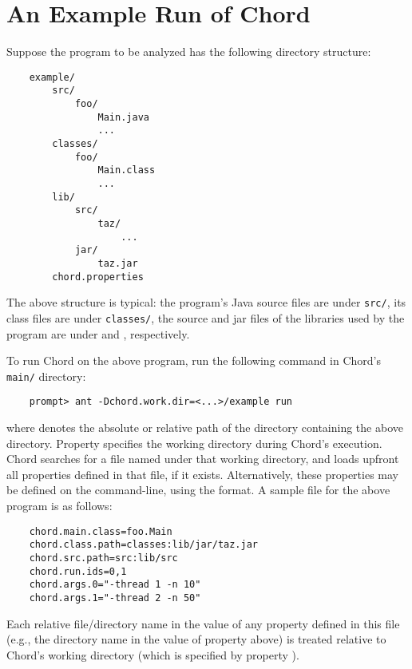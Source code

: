 \chapter{An Example Run of Chord}
\label{chap:example}

Suppose the program to be analyzed has the following directory structure:

\begin{verbatim}
    example/
        src/
            foo/
                Main.java
                ...
        classes/
            foo/
                Main.class
                ...
        lib/
            src/
                taz/
                    ...
            jar/
                taz.jar
        chord.properties
\end{verbatim}

The above structure is typical: the program's Java source
files are under {\tt src/}, its class files are under {\tt classes/},
the source and jar files of the libraries used by the program are
under  and , respectively.

To run Chord on the above program, run the following command in
Chord's {\tt main/} directory:

\begin{verbatim}
    prompt> ant -Dchord.work.dir=<...>/example run
\end{verbatim}

where  denotes the absolute or relative path of the
directory containing the above  directory.
Property  specifies the working directory during Chord's execution.
Chord searches for a file named  under that working directory, and
loads upfront all properties defined in that file, if it exists.  Alternatively, these properties
may be defined on the command-line, using the  format.
A sample  file for the above program is as follows:

\begin{verbatim}
    chord.main.class=foo.Main
    chord.class.path=classes:lib/jar/taz.jar
    chord.src.path=src:lib/src
    chord.run.ids=0,1
    chord.args.0="-thread 1 -n 10"
    chord.args.1="-thread 2 -n 50"
\end{verbatim}

Each relative file/directory name in the value of any property
defined in this file (e.g., the  directory name in the value of
property  above) is treated relative to Chord's working directory
(which is specified by property ).

